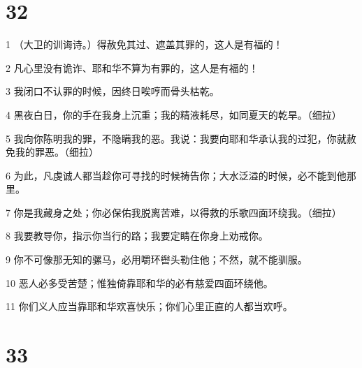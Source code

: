 \chapter{32}

\par 1 （大卫的训诲诗。）得赦免其过、遮盖其罪的，这人是有福的！
\par 2 凡心里没有诡诈、耶和华不算为有罪的，这人是有福的！
\par 3 我闭口不认罪的时候，因终日唉哼而骨头枯乾。
\par 4 黑夜白日，你的手在我身上沉重；我的精液耗尽，如同夏天的乾旱。（细拉）
\par 5 我向你陈明我的罪，不隐瞒我的恶。我说：我要向耶和华承认我的过犯，你就赦免我的罪恶。（细拉）
\par 6 为此，凡虔诚人都当趁你可寻找的时候祷告你；大水泛溢的时候，必不能到他那里。
\par 7 你是我藏身之处；你必保佑我脱离苦难，以得救的乐歌四面环绕我。（细拉）
\par 8 我要教导你，指示你当行的路；我要定睛在你身上劝戒你。
\par 9 你不可像那无知的骡马，必用嚼环辔头勒住他；不然，就不能驯服。
\par 10 恶人必多受苦楚；惟独倚靠耶和华的必有慈爱四面环绕他。
\par 11 你们义人应当靠耶和华欢喜快乐；你们心里正直的人都当欢呼。

\chapter{33}

